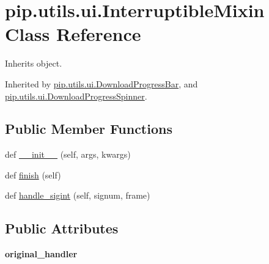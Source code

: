 \hypertarget{classpip_1_1utils_1_1ui_1_1_interruptible_mixin}{}\section{pip.\+utils.\+ui.\+Interruptible\+Mixin Class Reference}
\label{classpip_1_1utils_1_1ui_1_1_interruptible_mixin}


Inherits object.



Inherited by \hyperlink{classpip_1_1utils_1_1ui_1_1_download_progress_bar}{pip.\+utils.\+ui.\+Download\+Progress\+Bar}, and \hyperlink{classpip_1_1utils_1_1ui_1_1_download_progress_spinner}{pip.\+utils.\+ui.\+Download\+Progress\+Spinner}.

\subsection*{Public Member Functions}
\begin{DoxyCompactItemize}
\item 
def \hyperlink{classpip_1_1utils_1_1ui_1_1_interruptible_mixin_a2af170c5c8ea547803596b94fd457f35}{\+\_\+\+\_\+init\+\_\+\+\_\+} (self, args, kwargs)
\item 
def \hyperlink{classpip_1_1utils_1_1ui_1_1_interruptible_mixin_a84fd71988f3ecafdf36194897266f44b}{finish} (self)
\item 
def \hyperlink{classpip_1_1utils_1_1ui_1_1_interruptible_mixin_a7a4ee72f595de6a34cb077d829218874}{handle\+\_\+sigint} (self, signum, frame)
\end{DoxyCompactItemize}
\subsection*{Public Attributes}
\begin{DoxyCompactItemize}
\item 
\mbox{\label{classpip_1_1utils_1_1ui_1_1_interruptible_mixin_a20e0bc298b22a00c8c40ad1550f0d8f1}} 
{\bfseries original\+\_\+handler}
\end{DoxyCompactItemize}


